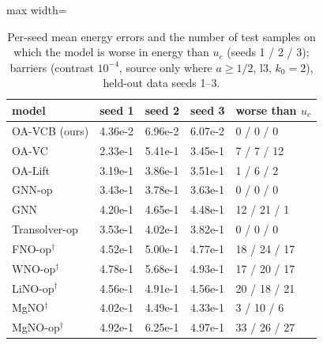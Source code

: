 \begin{table}[tbp]\centering\footnotesize\setlength{\tabcolsep}{4pt}
\caption{Per-seed mean energy errors and the number of test samples on which the model is worse in energy than $u_c$ (seeds 1 / 2 / 3); barriers (contrast $10^{-4}$, source only where $a\ge1/2$, l3, $k_0=2$), held-out data seeds 1--3.}\label{tab:barriersfull}
\begin{adjustbox}{max width=\linewidth}
\begin{tabular}{lllll}\toprule
model & seed 1 & seed 2 & seed 3 & worse than $u_c$ \\\midrule
OA-VCB (ours) & 4.36e-2 & 6.96e-2 & 6.07e-2 & 0 / 0 / 0 \\
OA-VC & 2.33e-1 & 5.41e-1 & 3.45e-1 & 7 / 7 / 12 \\
OA-Lift & 3.19e-1 & 3.86e-1 & 3.51e-1 & 1 / 6 / 2 \\
GNN-op & 3.43e-1 & 3.78e-1 & 3.63e-1 & 0 / 0 / 0 \\
GNN & 4.20e-1 & 4.65e-1 & 4.48e-1 & 12 / 21 / 1 \\
Transolver-op & 3.53e-1 & 4.02e-1 & 3.82e-1 & 0 / 0 / 0 \\
FNO-op$^\dagger$ & 4.52e-1 & 5.00e-1 & 4.77e-1 & 18 / 24 / 17 \\
WNO-op$^\dagger$ & 4.78e-1 & 5.68e-1 & 4.93e-1 & 17 / 20 / 17 \\
LiNO-op$^\dagger$ & 4.56e-1 & 4.91e-1 & 4.56e-1 & 20 / 18 / 21 \\
MgNO$^\dagger$ & 4.02e-1 & 4.49e-1 & 4.33e-1 & 3 / 10 / 6 \\
MgNO-op$^\dagger$ & 4.92e-1 & 6.25e-1 & 4.97e-1 & 33 / 26 / 27 \\
\bottomrule\end{tabular}
\end{adjustbox}
\end{table}
